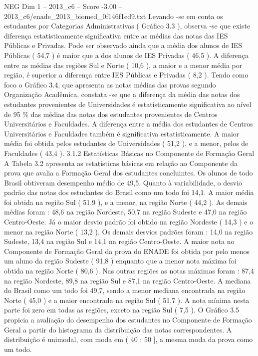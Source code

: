 \begin{textsample}{NEG Dim 1 – 2013\_c6 – Score -3.00 – 2013\_c6/enade\_2013\_biomed\_0f146f1ed9.txt}
Levando -se em conta os estudantes por Categorias Administrativas ( Gráfico 3.3 ), observa -se que existe diferença estatisticamente significativa entre as médias das notas das IES Públicas e Privadas.
Pode ser observado ainda que a média dos alunos de IES Públicas ( 54,7 ) é maior que a dos alunos de IES Privadas ( 46,5 ).
A diferença entre as médias das regiões Sul e Norte ( 10,6 ), a maior e a menor média por região, é superior a diferença entre IES Públicas e Privadas ( 8,2 ).
Tendo como foco o Gráfico 3.4, que apresenta as notas médias das provas segundo Organização Acadêmica, constata -se que a diferença da média das notas dos estudantes provenientes de Universidades é estatisticamente significativa ao nível de 95 \% das médias das notas dos estudantes provenientes de Centros Universitários e Faculdades.
A diferença entre a média dos estudantes de Centros Universitários e Faculdades também é significativa estatisticamente.
A maior média foi obtida pelos estudantes de Universidades ( 51,2 ), e a menor, pelos de Faculdades ( 43,4 ). 3.1.2 Estatísticas Básicas no Componente de Formação Geral A Tabela 3.2 apresenta as estatísticas básicas em relação ao Componente da prova que avalia a Formação Geral dos estudantes concluintes.
Os alunos de todo Brasil obtiveram desempenho médio de 49,5.
Quanto à variabilidade, o desvio padrão das notas dos estudantes do Brasil como um todo foi 14,1.
A maior média foi obtida na região Sul ( 51,9 ), e a menor, na região Norte ( 44,2 ).
As demais médias foram : 48,6 na região Nordeste, 50,7 na região Sudeste e 47,0 na região Centro-Oeste.
Já o maior desvio padrão foi obtido na região Nordeste ( 14,3 ) e o menor na região Norte ( 13,2 ).
Os demais desvios padrões foram : 14,0 na região Sudeste, 13,4 na região Sul e 14,1 na região Centro-Oeste.
A maior nota no Componente de Formação Geral da prova do ENADE foi obtida por pelo menos um aluno da região Sudeste ( 91,8 ) enquanto que a menor nota máxima foi obtida na região Norte ( 80,6 ).
Nas outras regiões as notas máximas foram : 87,4 na região Nordeste, 89,8 na região Sul e 87,1 na região Centro-Oeste.
A mediana do Brasil como um todo foi 49,7, sendo a menor mediana encontrada na região Norte ( 45,0 ) e a maior encontrada na região Sul ( 51,7 ).
A nota mínima nesta parte foi zero em todas as regiões, exceto na região Sul ( 7,5 ).
O Gráfico 3.5 propicia a avaliação do desempenho dos estudantes no Componente de Formação Geral a partir do histograma da distribuição das notas correspondentes.
A distribuição é unimodal, com moda em ( 40 ; 50 ], a mesma moda da prova como um todo.

\end{textsample}
